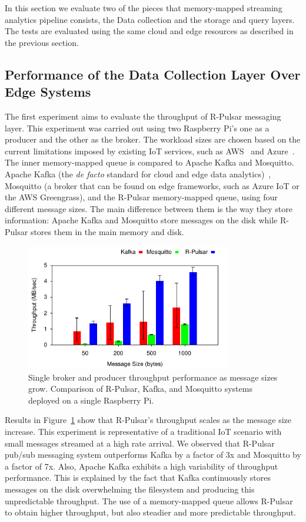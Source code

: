 In this section we evaluate two of the pieces that memory-mapped streaming analytics pipeline consists, the Data collection and the storage and query layers. The tests are evaluated using the same cloud and edge resources as described in the previous section.

\subsection{Performance of the Data Collection Layer Over Edge Systems}

The first experiment aims to evaluate the throughput of R-Pulsar messaging layer. This experiment was carried out using two Raspberry Pi's one as a producer and the other as the broker. The workload sizes are chosen based on the current limitations imposed by existing IoT services, such as AWS~\cite{AWS-MQTT} and Azure~\cite{AZURE-MQTT}. The inner memory-mapped queue is compared to Apache Kafka and Mosquitto. Apache Kafka (the \textit{de facto} standard for cloud and edge data analytics)~\cite{Young2017, firework, planner}, Mosquitto (a broker that can be found on edge frameworks, such as Azure IoT or the AWS Greengrass), and the R-Pulsar memory-mapped queue, using four different message sizes.  The main difference between them is the way they store information: Apache Kafka and Mosquitto store messages on the disk while R-Pulsar stores them in the main memory and disk. 

\begin{figure}[h]
  \centering
  \includegraphics[width=0.8\textwidth]{Results/ProducerBar}
    \caption{Single broker and producer throughput performance as message sizes grow. Comparison of R-Pulsar, Kafka, and Mosquitto systems deployed on a single Raspberry Pi.}
  \label{fig:ProducerBar}
\end{figure}

Results in Figure~\ref{fig:ProducerBar} show that R-Pulsar's throughput scales as the message size increase. This experiment is representative of a traditional IoT scenario with small messages streamed at a high rate arrival.
We observed that R-Pulsar pub/sub messaging system outperforms Kafka by a factor of 3x and Mosquitto by a factor of 7x. Also, Apache Kafka exhibits a high variability of throughput performance. 
This is explained by the fact that Kafka continuously stores messages on the disk overwhelming the filesystem and producing this unpredictable throughput.
The use of a memory-mapped queue allows R-Pulsar to obtain higher throughput, but also steadier and more predictable throughput.


